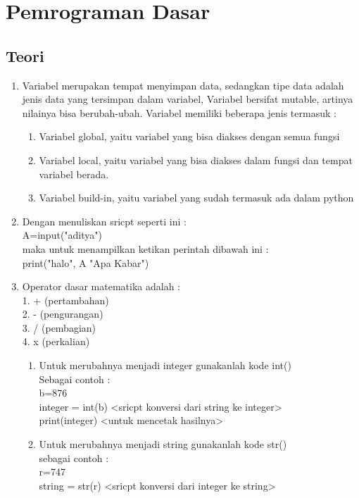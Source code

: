 \chapter{Pemrograman Dasar}
\section{Teori}
\begin{enumerate}
\item
Variabel merupakan tempat menyimpan data, sedangkan tipe data adalah jenis data yang tersimpan dalam variabel, Variabel bersifat mutable, artinya nilainya bisa berubah-ubah. Variabel memiliki beberapa jenis termasuk : 
	\begin{enumerate}
	\item
	Variabel global, yaitu variabel yang bisa diakses dengan semua fungsi
	\item
	Variabel local, yaitu variabel yang bisa diakses dalam fungsi dan tempat variabel berada.
	\item
	Variabel build-in, yaitu variabel yang sudah termasuk ada dalam python
	\end{enumerate}
\item
Dengan menuliskan sricpt seperti ini : \\
A=input("aditya") \\
maka untuk menampilkan ketikan perintah dibawah ini : \\
print("halo", A "Apa Kabar")
\item
Operator dasar matematika adalah : \\
	1. + (pertambahan)\\
	2. - (pengurangan)\\
	3. / (pembagian)\\
	4. x (perkalian)\\
\begin{enumerate}
\item
Untuk merubahnya menjadi integer gunakanlah kode int() \\ 
Sebagai contoh : \\
b=876 \\ integer = int(b) <sricpt konversi dari string ke integer> \\
print(integer) <untuk mencetak hasilnya> \\
\item
Untuk merubahnya menjadi string gunakanlah kode str() \\
sebagai contoh : \\
r=747 \\ string = str(r) <sricpt konversi dari integer ke string> \\

\end{enumerate}
\end{enumerate}
